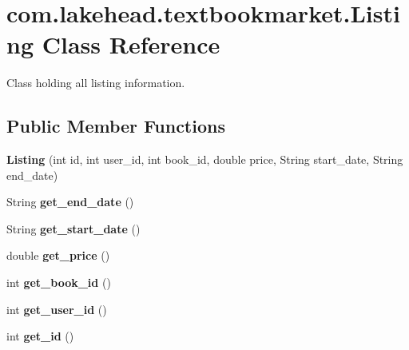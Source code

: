 \hypertarget{classcom_1_1lakehead_1_1textbookmarket_1_1_listing}{\section{com.\-lakehead.\-textbookmarket.\-Listing Class Reference}
\label{classcom_1_1lakehead_1_1textbookmarket_1_1_listing}
}


Class holding all listing information.  


\subsection*{Public Member Functions}
\begin{DoxyCompactItemize}
\item 
\hypertarget{classcom_1_1lakehead_1_1textbookmarket_1_1_listing_aa439fc38f5009d97bf1836b981d37763}{{\bfseries Listing} (int id, int user\-\_\-id, int book\-\_\-id, double price, String start\-\_\-date, String end\-\_\-date)}\label{classcom_1_1lakehead_1_1textbookmarket_1_1_listing_aa439fc38f5009d97bf1836b981d37763}

\item 
\hypertarget{classcom_1_1lakehead_1_1textbookmarket_1_1_listing_ae35ecd5650aeee1738491ca5157547bc}{String {\bfseries get\-\_\-end\-\_\-date} ()}\label{classcom_1_1lakehead_1_1textbookmarket_1_1_listing_ae35ecd5650aeee1738491ca5157547bc}

\item 
\hypertarget{classcom_1_1lakehead_1_1textbookmarket_1_1_listing_a09ce399641930af4dd68ad5e9b514535}{String {\bfseries get\-\_\-start\-\_\-date} ()}\label{classcom_1_1lakehead_1_1textbookmarket_1_1_listing_a09ce399641930af4dd68ad5e9b514535}

\item 
\hypertarget{classcom_1_1lakehead_1_1textbookmarket_1_1_listing_a1dc1bfe63349a32da9f381e0fc182607}{double {\bfseries get\-\_\-price} ()}\label{classcom_1_1lakehead_1_1textbookmarket_1_1_listing_a1dc1bfe63349a32da9f381e0fc182607}

\item 
\hypertarget{classcom_1_1lakehead_1_1textbookmarket_1_1_listing_ad0bb5c19b82124cb5973ee060067e2a5}{int {\bfseries get\-\_\-book\-\_\-id} ()}\label{classcom_1_1lakehead_1_1textbookmarket_1_1_listing_ad0bb5c19b82124cb5973ee060067e2a5}

\item 
\hypertarget{classcom_1_1lakehead_1_1textbookmarket_1_1_listing_a8599be9cbe4e7f5a95ad4f5f9bb4a305}{int {\bfseries get\-\_\-user\-\_\-id} ()}\label{classcom_1_1lakehead_1_1textbookmarket_1_1_listing_a8599be9cbe4e7f5a95ad4f5f9bb4a305}

\item 
\hypertarget{classcom_1_1lakehead_1_1textbookmarket_1_1_listing_a576c2f49d443b3feedd8c913bdbb7828}{int {\bfseries get\-\_\-id} ()}\label{classcom_1_1lakehead_1_1textbookmarket_1_1_listing_a576c2f49d443b3feedd8c913bdbb7828}

\end{DoxyCompactItemize}


